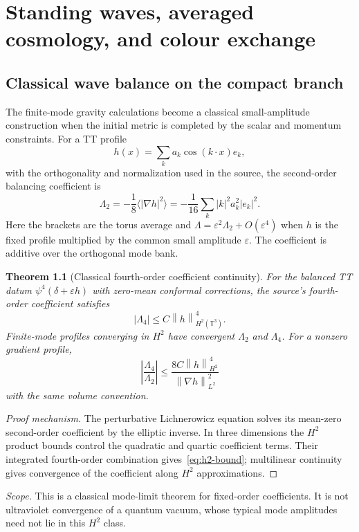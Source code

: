 \documentclass[11pt,a4paper,oneside]{book}
\theoremstyle{plain}
\newtheorem{theorem}{Theorem}[chapter]
\theoremstyle{definition}
\theoremstyle{remark}
\newcommand{\norm}[1]{\left\lVert#1\right\rVert}
\newcommand{\abs}[1]{\left\lvert#1\right\rvert}
\newcommand{\src}[2]{\cite{#1}}
\newcommand{\scope}[1]{\par\smallskip\noindent\textit{Scope.} #1\par\smallskip}
\begin{document}
\chapter{Standing waves, averaged cosmology, and colour exchange}
\label{ch:waves}
\section{Classical wave balance on the compact branch}
The finite-mode gravity calculations become a classical small-amplitude construction when the initial metric is completed by the scalar and momentum constraints. For a TT profile
\begin{equation}
 h(x)=\sum_k a_k\cos(k\cdot x)e_k,
\end{equation}
with the orthogonality and normalization used in the source, the second-order balancing coefficient is
\begin{equation}
 \Lambda_2=-\frac18\langle|\nabla h|^2\rangle
 =-\frac1{16}\sum_k|k|^2a_k^2|e_k|^2.
 \label{eq:wave-balance}
\end{equation}
Here the brackets are the torus average and $\Lambda=\varepsilon^2\Lambda_2+O(\varepsilon^4)$ when $h$ is the fixed profile multiplied by the common small amplitude $\varepsilon$. The coefficient is additive over the orthogonal mode bank. \src{R19}{thm:v19v93-lambda}

\begin{theorem}[Classical fourth-order coefficient continuity]
\label{thm:h2}
For the balanced TT datum $\psi^4(\delta+\varepsilon h)$ with zero-mean conformal corrections, the source's fourth-order coefficient satisfies
\begin{equation}
 |\Lambda_4|\le C\norm h_{H^2(\mathbb T^3)}^4.
 \label{eq:h2-bound}
\end{equation}
Finite-mode profiles converging in $H^2$ have convergent $\Lambda_2$ and $\Lambda_4$. For a nonzero gradient profile,
\begin{equation}
 \abs{\frac{\Lambda_4}{\Lambda_2}}
 \le\frac{8C\norm h_{H^2}^4}{\norm{\nabla h}_{L^2}^2}
\end{equation}
with the same volume convention.
\end{theorem}
\begin{proof}[Proof mechanism]
The perturbative Lichnerowicz equation solves its mean-zero second-order coefficient by the elliptic inverse. In three dimensions the $H^2$ product bounds control the quadratic and quartic coefficient terms. Their integrated fourth-order combination gives~\eqref{eq:h2-bound}; multilinear continuity gives convergence of the coefficient along $H^2$ approximations.
\end{proof}
\src{R19}{thm:v19v94-sobolev}
\scope{This is a classical mode-limit theorem for fixed-order coefficients. It is not ultraviolet convergence of a quantum vacuum, whose typical mode amplitudes need not lie in this $H^2$ class.}
\end{document}
